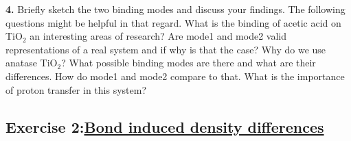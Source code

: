 \documentclass[]{article}
\begin{document}
\newline
\newline
\textbf{4.} Briefly sketch the two binding modes and discuss your findings. The following questions might be helpful in that regard. What is the binding of acetic acid on TiO$_{2}$ an interesting areas of research? Are mode1 and mode2 valid representations of a real system and if why is that the case? Why do we use anatase TiO$_{2}$? What possible binding modes are there and what are their differences. How do mode1 and mode2 compare to that. What is the importance of proton transfer in this system? 
     
\subsection*{Exercise 2:\underline{Bond induced density differences}}
\end{document}

